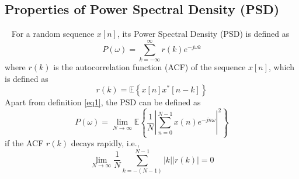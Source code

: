 \documentclass[10pt]{article}
\begin{document}
\subsection{Properties of Power Spectral Density (PSD)}
\ \indent
For a random sequence $x\left[n\right]$, its Power Spectral Density (PSD) 
is defined as
\begin{equation}
	P\left(\omega\right)=\sum_{k=-\infty}^{\infty} {r\left(k\right)e^{-j\omega k}} \label{eq1}
\end{equation}
where $r\left(k\right)$ is the autocorrelation function (ACF) of the sequence $x\left[n\right]$, which is defined as 
\begin{equation}
	r\left(k\right)=\mathbb{E}\left\{x\left[n\right]x^\ast\left[n-k\right]\right\} \label{eq2}
\end{equation}
Apart from definition \eqref{eq1}, the PSD can be defined as
\begin{equation}
	P\left(\omega\right) = \lim_{N\rightarrow\infty}{\mathbb{E}}\left\{\frac{1}{N}\left|\sum_{n=0}^{N-1}{x\left(n\right)e^{-jn\omega}}\right|^2\right\} \label{eq3}
\end{equation}
if the ACF $r\left(k\right)$ decays rapidly, i.e.,
\begin{equation}
	\lim_{N\rightarrow\infty}{\frac{1}{N}}\sum_{k=-\left(N-1\right)}^{N-1}\left|k\right|\left|r\left(k\right)\right|=0 \label{eq4}
\end{equation}
\end{document}
